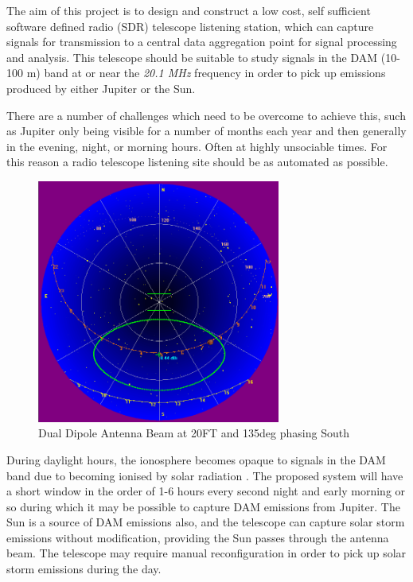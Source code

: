 \documentclass[runningheads,a4paper]{llncs}
\begin{document}
The aim of this project is to design and construct a low cost, self sufficient software defined radio (\gls{SDR}) telescope listening station, which can capture signals for transmission to a central data aggregation point for signal processing and analysis. This telescope should be suitable to study signals  in the \gls{DAM} (10-100 m) band at or near the \textit{20.1 MHz} frequency in order to pick up emissions produced by either Jupiter or the Sun.

There are a number of challenges which need to be overcome to achieve this, such as Jupiter only being visible for a number of months each year and then generally in the evening, night, or morning hours. Often at highly unsociable times. For this reason a radio telescope listening site should be as automated as possible.

%
\begin{figure}[here]
\centering
\includegraphics[width=8cm]{images/07}
\caption{Dual Dipole Antenna Beam at 20FT and 135deg phasing South \citep{nasa12}}
\label{fig:dual_dipole_20ft_135phasing_s}
\end{figure}
%

During daylight hours, the ionosphere becomes opaque to signals in the \gls{DAM} band due to becoming ionised by solar radiation \citep{nasa-ionosphere-12}. The proposed system will have a short window in the order of 1-6 hours every second night and early morning or so during which it may be possible to capture \gls{DAM} emissions from Jupiter. The Sun is a source of \gls{DAM} emissions also, and the telescope can capture solar storm emissions without modification, providing the Sun passes through the antenna beam. The telescope may require manual reconfiguration in order to pick up solar storm emissions during the day.
\end{document}
